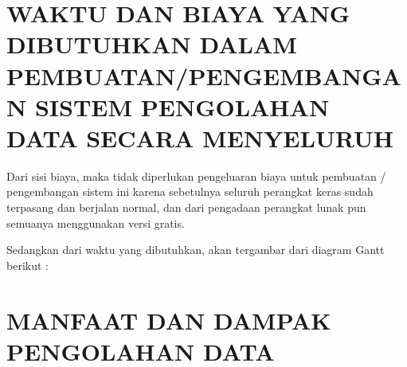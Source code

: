 \documentclass[pdftex,12pt, oneside]{article}
\begin{document}
\section{WAKTU DAN BIAYA YANG DIBUTUHKAN DALAM PEMBUATAN/PENGEMBANGAN SISTEM PENGOLAHAN DATA SECARA MENYELURUH}

Dari sisi biaya, maka tidak diperlukan pengeluaran biaya untuk pembuatan / pengembangan sistem ini karena sebetulnya seluruh perangkat keras sudah terpasang dan berjalan normal, dan dari pengadaan perangkat lunak pun semuanya menggunakan versi gratis.

Sedangkan dari waktu yang dibutuhkan, akan tergambar dari diagram Gantt berikut :



\section{MANFAAT DAN DAMPAK PENGOLAHAN DATA}
\end{document}
